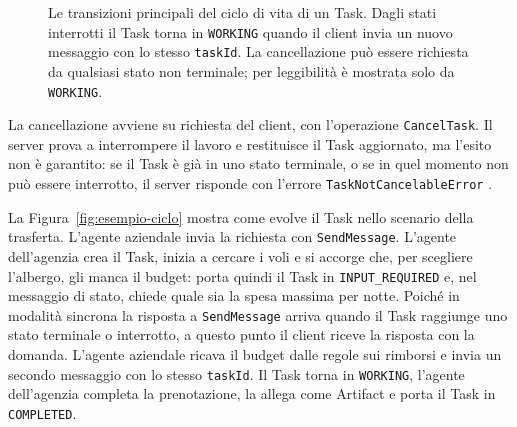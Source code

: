 \begin{figure}[htbp]
    \caption{Le transizioni principali del ciclo di vita di un Task. Dagli stati interrotti il Task torna in \texttt{WORKING} quando il client invia un nuovo messaggio con lo stesso \texttt{taskId}. La cancellazione può essere richiesta da qualsiasi stato non terminale; per leggibilità è mostrata solo da \texttt{WORKING}.}
    \label{fig:ciclo-task}
\end{figure}

La cancellazione avviene su richiesta del client, con l'operazione \texttt{CancelTask}. Il server prova a interrompere il lavoro e restituisce il Task aggiornato, ma l'esito non è garantito: se il Task è già in uno stato terminale, o se in quel momento non può essere interrotto, il server risponde con l'errore \texttt{Task\allowbreak Not\allowbreak Cancelable\allowbreak Error} \cite{a2aspec}.

La Figura~\ref{fig:esempio-ciclo} mostra come evolve il Task nello scenario della trasferta. L'agente aziendale invia la richiesta con \texttt{SendMessage}. L'agente dell'agenzia crea il Task, inizia a cercare i voli e si accorge che, per scegliere l'albergo, gli manca il budget: porta quindi il Task in \texttt{INPUT\_\allowbreak REQUIRED} e, nel messaggio di stato, chiede quale sia la spesa massima per notte. Poiché in modalità sincrona la risposta a \texttt{SendMessage} arriva quando il Task raggiunge uno stato terminale o interrotto, a questo punto il client riceve la risposta con la domanda. L'agente aziendale ricava il budget dalle regole sui rimborsi e invia un secondo messaggio con lo stesso \texttt{taskId}. Il Task torna in \texttt{WORKING}, l'agente dell'agenzia completa la prenotazione, la allega come Artifact e porta il Task in \texttt{COMPLETED}.

